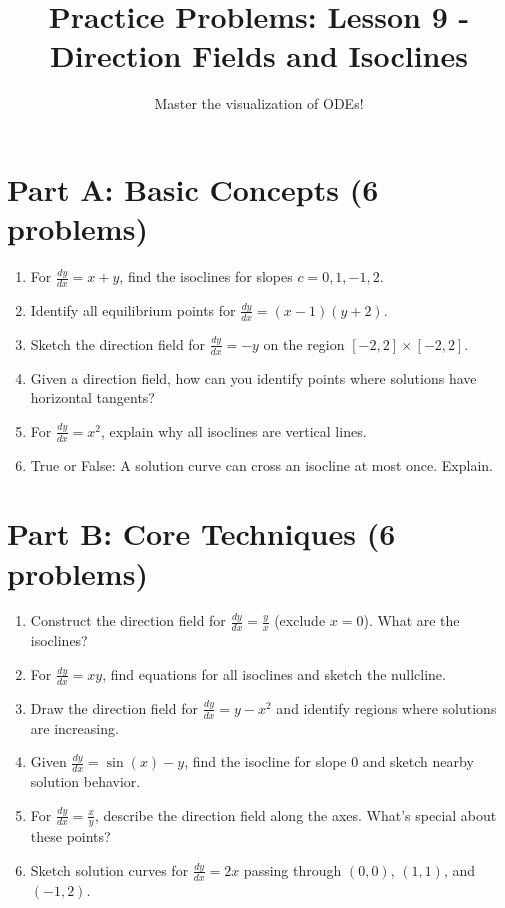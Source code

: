 \documentclass[12pt]{article}
\title{Practice Problems: Lesson 9 - Direction Fields and Isoclines}
\author{Master the visualization of ODEs!}
\date{}
\begin{document}
\maketitle

\section*{Part A: Basic Concepts (6 problems)}

\begin{enumerate}
\item For $\frac{dy}{dx} = x + y$, find the isoclines for slopes $c = 0, 1, -1, 2$.

\item Identify all equilibrium points for $\frac{dy}{dx} = (x-1)(y+2)$.

\item Sketch the direction field for $\frac{dy}{dx} = -y$ on the region $[-2,2] \times [-2,2]$.

\item Given a direction field, how can you identify points where solutions have horizontal tangents?

\item For $\frac{dy}{dx} = x^2$, explain why all isoclines are vertical lines.

\item True or False: A solution curve can cross an isocline at most once. Explain.
\end{enumerate}

\section*{Part B: Core Techniques (6 problems)}

\begin{enumerate}[resume]
\item Construct the direction field for $\frac{dy}{dx} = \frac{y}{x}$ (exclude $x=0$). What are the isoclines?

\item For $\frac{dy}{dx} = xy$, find equations for all isoclines and sketch the nullcline.

\item Draw the direction field for $\frac{dy}{dx} = y - x^2$ and identify regions where solutions are increasing.

\item Given $\frac{dy}{dx} = \sin(x) - y$, find the isocline for slope $0$ and sketch nearby solution behavior.

\item For $\frac{dy}{dx} = \frac{x}{y}$, describe the direction field along the axes. What's special about these points?

\item Sketch solution curves for $\frac{dy}{dx} = 2x$ passing through $(0,0)$, $(1,1)$, and $(-1,2)$.
\end{enumerate}
\end{document}
